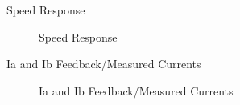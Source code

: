 \begin{frame}{Speed Response}
	\begin{figure}
		\centering

		\caption{Speed Response}
	\end{figure}
\end{frame}


\begin{frame}{Ia and Ib Feedback/Measured Currents}
	\begin{figure}
		\centering

		\caption{Ia and Ib Feedback/Measured Currents}
	\end{figure}
\end{frame}


